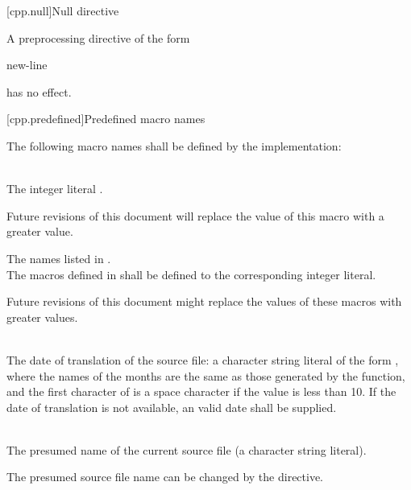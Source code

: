 [cpp.null]{Null directive}%

\pnum
A preprocessing directive of the form
\begin{ncsimplebnf}
\terminal{\#} new-line
\end{ncsimplebnf}
has no effect.

[cpp.predefined]{Predefined macro names}
%

\pnum
The following macro names shall be defined by the implementation:

\begin{description}

\item
{}%
\\
The integer literal \tcode{\cppver}.
\begin{note}
Future revisions of this document will
replace the value of this macro with a greater value.
\end{note}

\item The names listed in .\\
The macros defined in  shall be defined to
the corresponding integer literal.
\begin{note}
Future revisions of this document might replace
the values of these macros with greater values.
\end{note}

\item
{}%
\\
The date of translation of the source file:
a character string literal of the form
,
where the names of the months are the same as those generated
by the
function,
and the first character of
is a space character if the value is less than 10.
If the date of translation is not available,
an  valid date
shall be supplied.

\item
{}%
\\
The presumed name of the current source file (a character string
literal).
\begin{footnote}
The presumed source file name can be changed by the  directive.
\end{footnote}


\end{description}
